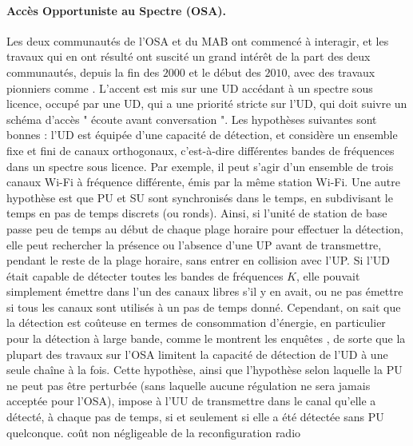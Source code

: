 \begin{resume_fr}
\paragraph{Accès Opportuniste au Spectre (OSA).}
%
Les deux communautés de l'OSA et du MAB ont commencé à interagir, et les travaux qui en ont résulté ont suscité un grand intérêt de la part des deux communautés, depuis la fin des $2000$ et le début des $2010$, avec des travaux pionniers comme \cite{Liu08,Zhao10,Jouini09,Jouini10}.
L'accent est mis sur une UD accédant à un spectre sous licence, occupé par une UD, qui a une priorité stricte sur l'UD, qui doit suivre un schéma d'accès " écoute avant conversation ".
%
Les hypothèses suivantes sont bonnes :
l'UD est équipée d'une capacité de détection,
et considère un ensemble fixe et fini de canaux orthogonaux, c'est-à-dire différentes bandes de fréquences dans un spectre sous licence.
Par exemple, il peut s'agir d'un ensemble de trois canaux Wi-Fi à fréquence différente, émis par la même station Wi-Fi.
Une autre hypothèse est que PU et SU sont synchronisés dans le temps, en subdivisant le temps en pas de temps discrets (ou ronds).
%
Ainsi, si l'unité de station de base passe peu de temps au début de chaque plage horaire pour effectuer la détection, elle peut rechercher la présence ou l'absence d'une UP avant de transmettre, pendant le reste de la plage horaire, sans entrer en collision avec l'UP.
Si l'UD était capable de détecter toutes les bandes de fréquences $K$, elle pouvait simplement émettre dans l'un des canaux libres s'il y en avait, ou ne pas émettre si tous les canaux sont utilisés à un pas de temps donné.
Cependant, on sait que la détection est coûteuse en termes de consommation d'énergie, en particulier pour la détection à large bande, comme le montrent les enquêtes \cite{yucek2009survey,subhedar2011spectrum}, de sorte que la plupart des travaux sur l'OSA limitent la capacité de détection de l'UD à une seule chaîne à la fois.
Cette hypothèse, ainsi que l'hypothèse selon laquelle la PU ne peut pas être perturbée (sans laquelle aucune régulation ne sera jamais acceptée pour l'OSA), impose à l'UU de transmettre dans le canal qu'elle a détecté, à chaque pas de temps, si et seulement si elle a été détectée sans PU quelconque.
coût non négligeable de la reconfiguration radio


\end{resume_fr}
